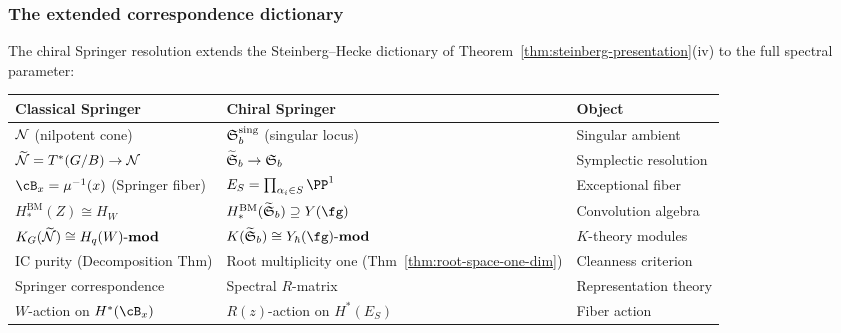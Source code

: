 \subsubsection{The extended correspondence dictionary}
\label{sssec:extended-dictionary}

The chiral Springer resolution extends the Steinberg--Hecke dictionary
of Theorem~\ref{thm:steinberg-presentation}(iv) to the full spectral
parameter:

\begin{center}
\renewcommand{\arraystretch}{1.15}
\begin{tabular}{@{}lll@{}}
\toprule
\textbf{Classical Springer} &
\textbf{Chiral Springer} &
\textbf{Object} \\
\midrule
$\mathcal{N}$ (nilpotent cone) &
$\mathfrak{S}_b^{\mathrm{sing}}$ (singular locus) &
Singular ambient \\
$\widetilde{\mathcal{N}} = T^*(G/B) \to \mathcal{N}$ &
$\widetilde{\mathfrak{S}}_b \to \mathfrak{S}_b$ &
Symplectic resolution \\
$\cB_x = \mu^{-1}(x)$ (Springer fiber) &
$E_S = \prod_{\alpha_i \in S} \PP^1$ &
Exceptional fiber \\
$H_*^{\mathrm{BM}}(Z) \cong H_W$ &
$H_*^{\mathrm{BM}}(\widetilde{\Steinberg}_b)
 \supseteq Y(\fg)$ &
Convolution algebra \\
$K_G(\widetilde{\mathcal{N}}) \cong H_q(W)\text{-}\mathbf{mod}$ &
$K(\widetilde{\Steinberg}_b) \cong
 Y_\hbar(\fg)\text{-}\mathbf{mod}$ &
$K$-theory modules \\
IC purity (Decomposition Thm) &
Root multiplicity one
 (Thm~\ref{thm:root-space-one-dim}) &
Cleanness criterion \\
Springer correspondence &
Spectral $R$-matrix &
Representation theory \\
$W$-action on $H^*(\cB_x)$ &
$R(z)$-action on $H^*(E_S)$ &
Fiber action \\
\bottomrule
\end{tabular}
\end{center}

